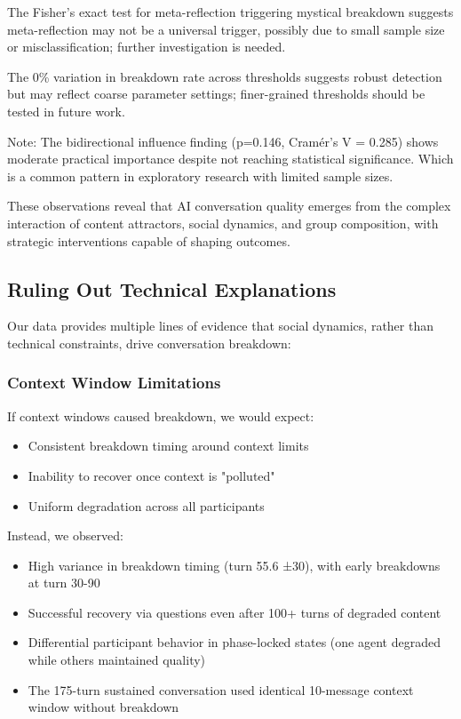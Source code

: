 \documentclass[11pt,letterpaper]{article}
\newcommand{\exponedataBidirectionalPValue}{p=0.146}
\newcommand{\exponedataMeanBreakdownTurn}{55.6}
\newcommand{\exponedataStdBreakdownTurn}{±30}
\newcommand{\exponedataEarlyBreakdownRange}{30-90}
\newcommand{\exponedataNegativeCase}{175}
\begin{document}
The Fisher’s exact test for meta-reflection triggering mystical breakdown suggests meta-reflection may not be a universal trigger, possibly due to small sample size or misclassification; further investigation is needed.

The 0\% variation in breakdown rate across thresholds suggests robust detection but may reflect coarse parameter settings; finer-grained thresholds should be tested in future work.

Note: The bidirectional influence finding (\exponedataBidirectionalPValue{}, Cramér's V = 0.285) shows moderate practical importance despite not reaching statistical significance. Which is a common pattern in exploratory research with limited sample sizes.

These observations reveal that AI conversation quality emerges from the complex interaction of content attractors, social dynamics, and group composition, with strategic interventions capable of shaping outcomes.

\subsection{Ruling Out Technical Explanations}

Our data provides multiple lines of evidence that social dynamics, rather than technical constraints, drive conversation breakdown:

\subsubsection{Context Window Limitations}

If context windows caused breakdown, we would expect:
\begin{itemize}
    \item Consistent breakdown timing around context limits
    \item Inability to recover once context is "polluted"
    \item Uniform degradation across all participants
\end{itemize}

Instead, we observed:
\begin{itemize}
    \item High variance in breakdown timing (turn \exponedataMeanBreakdownTurn{} \exponedataStdBreakdownTurn{}), with early breakdowns at turn \exponedataEarlyBreakdownRange{} 
    \item Successful recovery via questions even after 100+ turns of degraded content
    \item Differential participant behavior in phase-locked states (one agent degraded while others maintained quality)
    \item The \exponedataNegativeCase{}-turn sustained conversation used identical 10-message context window without breakdown
\end{itemize}
\end{document}
